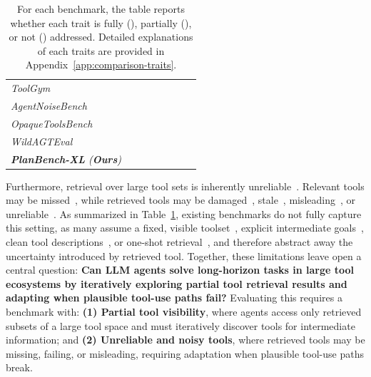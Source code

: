 \documentclass{llmxive}
\providecommand{\cmark}{\ding{51}}
\providecommand{\xmark}{\ding{55}}
\providecommand{\gmark}{\ding{51}}
\providecommand{\BENCH}[1]{\textbf{PlanBench-XL}}
\begin{document}
\begin{table}[t]
{\begin{tabular}{lccccccc}
    \textit{ToolGym}~\citep{ToolGym} & \cmark & \cmark & \xmark & \xmark & \cmark & \cmark & \cmark \\
    \textit{AgentNoiseBench}~\citep{AgentNoiseBench} & \cmark & \xmark & \xmark & \xmark & \cmark & \xmark & \cmark \\
    \textit{OpaqueToolsBench}~\citep{OpaqueToolsBench} & \cmark & \xmark & \xmark & \xmark & \cmark & \xmark & \cmark \\
    \textit{WildAGTEval}~\citep{kim2026perfectapiscomprehensiveevaluation} & \cmark & \xmark & \xmark & \xmark & \cmark & \xmark & \cmark \\
    \midrule
    \textit{\BENCH{} (\textbf{\textit{Ours}})} & \cmark & \cmark & \cmark & \cmark & \cmark & \cmark & \cmark \\
    \bottomrule
    \end{tabular}
}
\caption{For each benchmark, the table reports whether each trait is fully (\cmark), partially (\gmark), or not (\xmark) addressed. Detailed explanations of each traits are provided in Appendix~\ref{app:comparison-traits}. }
\label{tab:comparison-table}
\vspace{-0.1in}
\end{table}

Furthermore, retrieval over large tool sets is inherently unreliable~\citep{Tool-Retrieval-is-not-reliable-1}. 
Relevant tools may be missed~\citep{COLT}, while retrieved tools may be damaged~\citep{OpaqueToolsBench}, stale~\citep{ToolQA-D}, misleading~\citep{TRUSTDESC}, or unreliable~\citep{ToolSandbox}. 
As summarized in Table~\ref{tab:comparison-table}, existing benchmarks do not fully capture this setting, as many assume a fixed, visible toolset~\citep{AppWorld}, explicit intermediate goals~\citep{ToolHop}, clean tool descriptions~\citep{OpaqueToolsBench}, or one-shot retrieval~\citep{ToolBench}, and therefore abstract away the uncertainty introduced by retrieved tool.
Together, these limitations leave open a central question: \textbf{Can LLM agents solve long-horizon tasks in large tool ecosystems by iteratively exploring partial tool retrieval results and adapting when plausible tool-use paths fail?} 
Evaluating this requires a benchmark with:
\textbf{(1) Partial tool visibility}, where agents access only retrieved subsets of a large tool space and must iteratively discover tools for intermediate information; and
\textbf{(2) Unreliable and noisy tools}, where retrieved tools may be missing, failing, or misleading, requiring adaptation when plausible tool-use paths break.
\end{document}
